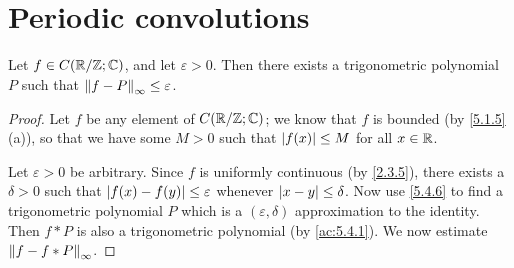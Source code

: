 \section{Periodic convolutions}\label{sec:5.4}

\begin{thm}\label{5.4.1}
  Let \(f \in C(\R / \Z ; \C)\), and let \(\varepsilon > 0\).
  Then there exists a trigonometric polynomial \(P\) such that \(\norm*{f - P}_{\infty} \leq \varepsilon\).
\end{thm}

\begin{proof}
  Let \(f\) be any element of \(C(\R / \Z ; \C)\);
  we know that \(f\) is bounded (by \cref{5.1.5}(a)), so that we have some \(M > 0\) such that \(\abs{f(x)} \leq M\) for all \(x \in \R\).

  Let \(\varepsilon > 0\) be arbitrary.
  Since \(f\) is uniformly continuous (by \cref{2.3.5}), there exists a \(\delta > 0\) such that \(\abs{f(x) - f(y)} \leq \varepsilon\) whenever \(\abs{x - y} \leq \delta\).
  Now use \cref{5.4.6} to find a trigonometric polynomial \(P\) which is a \((\varepsilon, \delta)\) approximation to the identity.
  Then \(f * P\) is also a trigonometric polynomial (by \cref{ac:5.4.1}).
  We now estimate \(\norm*{f - f * P}_{\infty}\).


\end{proof}
